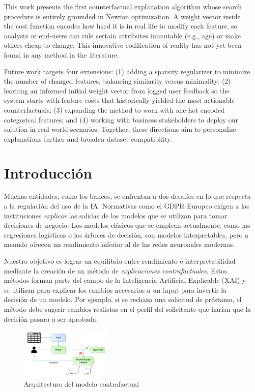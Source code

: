 \documentclass[12pt]{extarticle}
\numberwithin{equation}{section}
\begin{document}
This work presents the first counterfactual explanation algorithm whose search procedure is entirely grounded in Newton optimization. A weight vector inside the cost function encodes how hard it is in real life to modify each feature, so analysts or end-users can rule certain attributes immutable (e.g., age) or make others cheap to change. This innovative codification of reality has not yet been found in any method in the literature.

Future work targets four extensions: (1) adding a sparsity regularizer to minimize the number of changed features, balancing similarity versus minimality; (2) learning an informed initial weight vector from logged user feedback so the system starts with feature costs that historically yielded the most actionable counterfactuals; (3) expanding the method to work with one-hot encoded categorical features; and (4) working with business stakeholders to deploy our solution in real world scenarios. Together, these directions aim to personalize explanations further and broaden dataset compatibility.

\newpage

\section*{Introducción}
Muchas entidades, como los bancos, se enfrentan a dos desafíos en lo que respecta a la regulación del uso de la IA. Normativas como el GDPR Europeo exigen a las instituciones \emph{explicar} las salidas de los modelos que se utilizan para tomar decisiones de negocio. Los modelos clásicos que se emplean actualmente, como las regresiones logísticas o los árboles de decisión, son modelos interpretables, pero a menudo ofrecen un rendimiento inferior al de las redes neuronales modernas.

Nuestro objetivo es lograr un equilibrio entre rendimiento e interpretabilidad mediante la creación de un método de \emph{explicaciones contrafactuales}. Estos métodos forman parte del campo de la Inteligencia Artificial Explicable (XAI) y se utilizan para explicar los cambios necesarios a un input para invertir la decisión de un modelo. Por ejemplo, si se rechaza una solicitud de préstamo, el método debe sugerir cambios realistas en el perfil del solicitante que harían que la decisión pasara a ser aprobada.

\begin{figure}[H]
\centering
\includegraphics[width=0.4\textwidth]{images/diagram}
\caption{Arquitectura del modelo contrafactual}
\label{fig:architecture_esp}
\end{figure}
\end{document}
